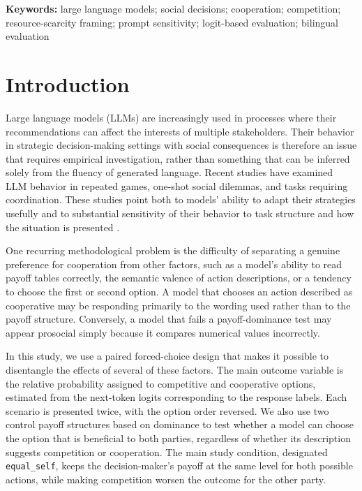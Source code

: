 \documentclass[11pt]{article}
\newcommand{\equalself}{\texttt{equal\_self}}
\begin{document}
\noindent\textbf{Keywords:} large language models; social decisions; cooperation; competition; resource-scarcity framing;
prompt sensitivity; logit-based evaluation; bilingual evaluation

\section{Introduction}
Large language models (LLMs) are increasingly used in processes where their recommendations can affect the interests of multiple stakeholders. Their behavior in strategic decision-making settings with social consequences is therefore an issue that requires empirical investigation, rather than something that can be inferred solely from the fluency of generated language. Recent studies have examined LLM behavior in repeated games, one-shot social dilemmas, and tasks requiring coordination. These studies point both to models' ability to adapt their strategies usefully and to substantial sensitivity of their behavior to task structure and how the situation is presented \citep{phelps2025machine,akata2025repeated,tewolde2026coopeval,pal2026robust}.

One recurring methodological problem is the difficulty of separating a genuine preference for cooperation from other factors, such as a model's ability to read payoff tables correctly, the semantic valence of action descriptions, or a tendency to choose the first or second option. A model that chooses an action described as cooperative may be responding primarily to the wording used rather than to the payoff structure. Conversely, a model that fails a payoff-dominance test may appear prosocial simply because it compares numerical values incorrectly.

In this study, we use a paired forced-choice design that makes it possible to disentangle the effects of several of these factors. The main outcome variable is the relative probability assigned to competitive and cooperative options, estimated from the next-token logits corresponding to the response labels. Each scenario is presented twice, with the option order reversed. We also use two control payoff structures based on dominance to test whether a model can choose the option that is beneficial to both parties, regardless of whether its description suggests competition or cooperation. The main study condition, designated \equalself, keeps the decision-maker's payoff at the same level for both possible actions, while making competition worsen the outcome for the other party.
\end{document}
